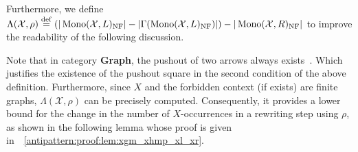 \begin{definition}
\begin{itemize}
\begin{center}
{
         }
        \end{center}
    \end{itemize}
    Furthermore, we define $\Lambda(\mathcal{X},\rho) \overset{\operatorname{def}}{=} (|\operatorname{Mono}(\mathcal{X},L)_{\operatorname{NF}}| - 
    |\Gamma(\operatorname{Mono}(\mathcal{X},L)_{\operatorname{NF}})|) -
   |\operatorname{Mono}(\mathcal{X},R)_{\operatorname{NF}}|$ to improve the readability of the following discussion.
\end{definition}
Note that in category \textbf{Graph}, the pushout of two arrows always exists~\cite[p.188]{corradini1997algebraic}. Which justifies the existence of the pushout square in the second condition of the above definition.
Furthermore, since $X$ and the forbidden context (if exists) are finite graphs, $\Lambda(\mathcal{X},\rho)$ can be precisely computed. Consequently, it provides a lower bound for the change in the number of $X$-occurrences in a rewriting step using $\rho$, as shown in the following lemma whose proof is given in~\textsection~\ref{antipattern:proof:lem:xgm_xhmp_xl_xr}.

